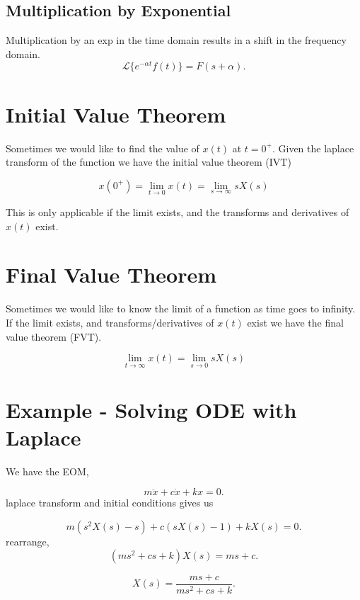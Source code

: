 \documentclass[12pt, a4paper]{report}
\begin{document}
  \subsection{Multiplication by Exponential}
  Multiplication by an exp in the time domain results in a shift in the frequency domain.
  \[
      \mathcal{L}\{e^{-\alpha t}f(t)\} = F(s + \alpha)
    .\]

  \section{Initial Value Theorem}

  Sometimes we would like to find the value of $ x(t) $ at $ t = 0^+. $ Given the laplace transform of the function we have the initial value theorem (IVT)

  \begin{equation}
    x(0^+) = \lim_{t \rightarrow 0} x(t) = \lim_{s \rightarrow \infty} sX(s)
  \end{equation}

  This is only applicable if the limit exists, and the transforms and derivatives of $ x(t) $ exist.

  \section{Final Value Theorem}

  Sometimes we would like to know the limit of a function as time goes to infinity. If the limit exists, and transforms/derivatives of $ x(t) $ exist we have the final value theorem (FVT).

  \begin{equation}
    \lim_{t \rightarrow \infty} x(t) = \lim_{s \rightarrow 0} sX(s)
  \end{equation}

  \section{Example - Solving ODE with Laplace}

  We have the EOM,

  \[
      m\ddot x + c \dot x + kx = 0
    .\]
  \noindent
  laplace transform and initial conditions gives us

  \[
      m(s ^2X(s) -s) + c(sX(s) - 1) + kX(s) = 0
    .\]
  \noindent
  rearrange,
  \[
      (ms ^2 + cs + k)X(s) = ms + c
    .\]

  \[
      X(s) = \frac{ms + c}{ms ^2 + cs + k}
    .\]
\end{document}

